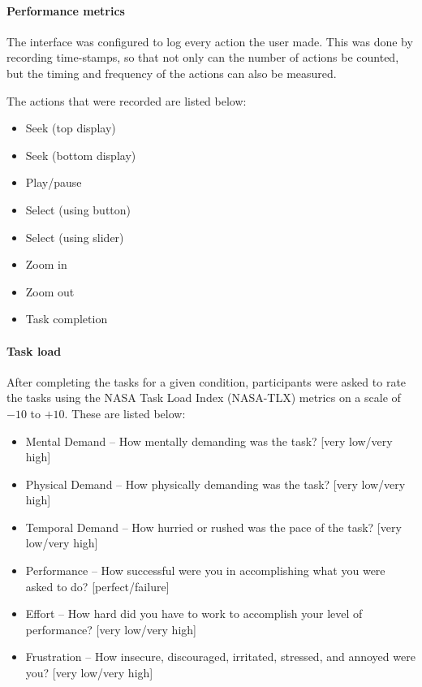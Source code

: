 \paragraph{Performance metrics}
The interface was configured to log every action the user made. This was done
by recording time-stamps, so that not only can the number of actions be counted,
but the timing and frequency of the actions can also be measured.

The actions that were recorded are listed below:

{\singlespacing
\begin{itemize}
  \item Seek (top display)
  \item Seek (bottom display)
  \item Play/pause
  \item Select (using button)
  \item Select (using slider)
  \item Zoom in
  \item Zoom out
  \item Task completion
\end{itemize}
}

\paragraph{Task load}
After completing the tasks for a given condition, participants were asked to
rate the tasks using the NASA Task Load Index (NASA-TLX) \citep{Hart1988}
metrics on a scale of $-10$ to $+10$. These are listed below:

{\singlespacing
\begin{itemize}
  \item Mental Demand -- How mentally demanding was the task? [very low/very
    high]
  \item Physical Demand -- How physically demanding was the task? [very
    low/very high]
  \item Temporal Demand -- How hurried or rushed was the pace of the task?
    [very low/very high]
  \item Performance -- How successful were you in accomplishing what you were
    asked to do? [perfect/failure]
  \item Effort -- How hard did you have to work to accomplish your level of
    performance? [very low/very high]
  \item Frustration -- How insecure, discouraged, irritated, stressed, and
    annoyed were you? [very low/very high]
\end{itemize}
}

